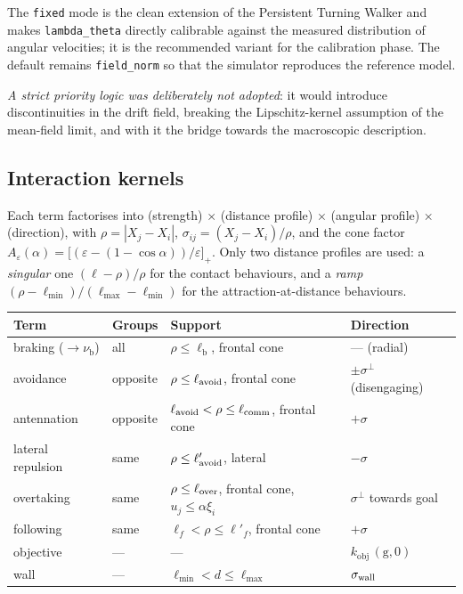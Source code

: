 \documentclass[11pt,a4paper]{article}
\newcommand{\brake}{\mathrm{b}}
\newcommand{\obj}{\mathrm{obj}}
\newcommand{\code}[1]{\texttt{#1}}
\begin{document}
The \code{fixed} mode is the clean extension of the Persistent Turning Walker
and makes \code{lambda\_theta} directly calibrable against the measured
distribution of angular velocities; it is the recommended variant for the
calibration phase. The default remains \code{field\_norm} so that the simulator
reproduces the reference model.

\emph{A strict priority logic was deliberately not adopted}: it would introduce
discontinuities in the drift field, breaking the Lipschitz-kernel assumption of
the mean-field limit, and with it the bridge towards the macroscopic
description.

\subsection{Interaction kernels}

Each term factorises into (strength) $\times$ (distance profile) $\times$
(angular profile) $\times$ (direction), with $\rho=|X_j-X_i|$,
$\sigma_{ij}=(X_j-X_i)/\rho$, and the cone factor
$A_\varepsilon(\alpha)=\big[(\varepsilon-(1-\cos\alpha))/\varepsilon\big]_+$.
Only two distance profiles are used: a \emph{singular} one $(\ell-\rho)/\rho$
for the contact behaviours, and a \emph{ramp}
$(\rho-\ell_{\min})/(\ell_{\max}-\ell_{\min})$ for the attraction-at-distance
behaviours.

\begin{center}
\begin{tabular}{@{}llll@{}}
\toprule
Term & Groups & Support & Direction \\
\midrule
braking ($\to\nu_\brake$) & all & $\rho\leq\ell_\brake$, frontal cone & --- (radial) \\
avoidance & opposite & $\rho\leq\ell_{\rm avoid}$, frontal cone & $\pm\sigma^\perp$ (disengaging) \\
antennation & opposite & $\ell_{\rm avoid}<\rho\leq\ell_{\rm comm}$, frontal cone & $+\sigma$ \\
lateral repulsion & same & $\rho\leq\ell'_{\rm avoid}$, lateral & $-\sigma$ \\
overtaking & same & $\rho\leq\ell_{\rm over}$, frontal cone, $u_j\leq\alpha\xi_i$ & $\sigma^\perp$ towards goal \\
following & same & $\ell_f<\rho\leq\ell'_f$, frontal cone & $+\sigma$ \\
objective & --- & --- & $k_\obj\,(\mathrm g,0)$ \\
wall & --- & $\ell_{\min}<d\leq\ell_{\max}$ & $\sigma_{\rm wall}$ \\
\bottomrule
\end{tabular}
\end{center}
\end{document}
